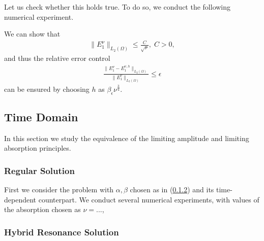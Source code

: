 \documentclass[proc]{edpsmath}
\begin{document}
Let us check whether this holds true. 
To do so, we conduct the following numerical experiment. 



We can show that 
\begin{align*}
 \|E^{\nu}_{1}\|_{L_{2}(\Omega)}\leq \frac{C}{\sqrt{\nu}},\; C>0, 
\end{align*}
and thus the relative error control
\begin{align*}
 \frac{\|E^{\nu}_{1}-E^{\nu,h}_{1}\|_{L_{2}(\Omega)}}{\|E^{\nu}_{1}\|_{L_{2}(\Omega)}}\leq \epsilon
\end{align*}
can be ensured by choosing $h$ as $\beta_{\epsilon}\nu^{\frac{3}{4}}$.


\subsection{Time Domain}
In this section we study the equivalence of the limiting amplitude and limiting absorption principles. 
\subsubsection{Regular Solution}
First we consider the problem with $\alpha,\beta$ chosen as in (\ref{}) and its time-dependent counterpart. We conduct several numerical experiments, with values of the absorption chosen as $\nu=...$, 


\subsubsection{Hybrid Resonance Solution}
\end{document}
